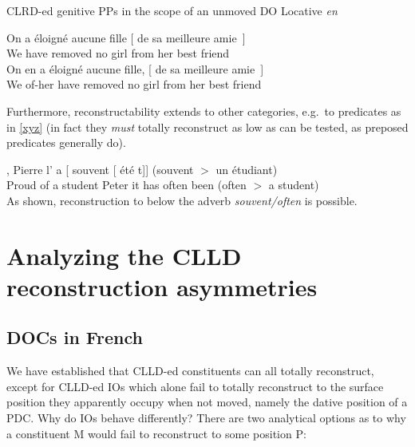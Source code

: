 \documentclass[output=paper]{langsci/langscibook}
\begin{document}
\begin{exe}
    \ex \checkmark \gls{CLRD}-ed genitive
PPs in the scope of an unmoved DO \hfill{Locative {\it en}}
    \begin{xlist}
    \ex
	\gll      On     a   \'{e}loign\'{e}  aucune fille [ de sa   meilleure amie~]\\
    We   have   removed   no girl {}  from her   best        friend\\
    \ex
    \gll On  en   a   \'{e}loign\'{e}  aucune fille, [ de sa   meilleure amie~] \\
    We   of-her have   removed   no girl {} from her   best        friend  \\
    \end{xlist}
\end{exe}
%
Furthermore, reconstructability extends to other categories, e.g.\ to
predicates as in \eqref{xyz} (in fact they {\it must} totally reconstruct as low
as can be tested, as preposed predicates generally do).\largerpage[2]

\ea \label{xyz}
,    Pierre
l' a     [ souvent [ \'{e}t\'{e} t]] (\checkmark souvent $>$ un \'{e}tudiant)\\
{}  Proud of a student      Peter  it has  {} often {} been	{} (\checkmark often $>$ a student)\\
\z
%
As shown, reconstruction to below the adverb {\it souvent/often} is possible.

\section{Analyzing the CLLD reconstruction asymmetries}

\subsection{\glspl{DOC} in French}

We have established that \gls{CLLD}-ed constituents can all totally
reconstruct,  except for \gls{CLLD}-ed \glspl{IO} which alone fail to totally
reconstruct to the surface position they apparently occupy when not moved,
namely the dative position of a \gls{PDC}. Why do \glspl{IO} behave
differently?  There are two analytical options as to  why a constituent M would
fail to reconstruct to some position P:
\end{document}
